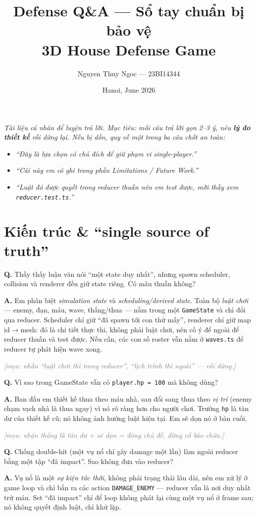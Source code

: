 \documentclass[12pt,a4paper]{article}
\title{\bfseries Defense Q\&A --- Sổ tay chuẩn bị bảo vệ\\
       \large 3D House Defense Game}
\author{Nguyen Thuy Ngoc --- 23BI14344}
\date{Hanoi, June 2026}
\newcommand{\QA}[2]{%
  \par\medskip\noindent\textbf{\textcolor{blue!60!black}{Q.}} #1\par
  \smallskip\noindent\textbf{\textcolor{green!45!black}{A.}} #2\par}
\newcommand{\tip}[1]{\par\smallskip\noindent%
  \textit{\textcolor{gray}{[mẹo: #1]}}\par}
\begin{document}
\maketitle

\noindent\textit{Tài liệu cá nhân để luyện trả lời. Mục tiêu: mỗi câu trả lời
gọn 2--3 ý, nêu \textbf{lý do thiết kế} rồi dừng lại. Nếu bị dồn, quy về một
trong ba câu chốt an toàn:}
\begin{itemize}[nosep]
  \item \textit{``Đây là lựa chọn có chủ đích để giữ phạm vi single-player.''}
  \item \textit{``Cái này em có ghi trong phần Limitations / Future Work.''}
  \item \textit{``Luật đó được quyết trong reducer thuần nên em test được, mời
        thầy xem \texttt{reducer.test.ts}.''}
\end{itemize}

\tableofcontents
\bigskip

\section{Kiến trúc \& ``single source of truth''}

\QA{Thầy thấy luận văn nói ``một state duy nhất'', nhưng spawn scheduler, collision
và renderer đều giữ state riêng. Có mâu thuẫn không?}
{Em phân biệt \emph{simulation state} và \emph{scheduling/derived state}. Toàn bộ
\emph{luật chơi} --- enemy, đạn, máu, wave, thắng/thua --- nằm trong một
\texttt{GameState} và chỉ đổi qua reducer. Scheduler chỉ giữ ``đã spawn tới con
thứ mấy'', renderer chỉ giữ map id$\to$mesh: đó là chi tiết thực thi, không phải
luật chơi, nên cố ý để ngoài để reducer thuần và test được. Nếu cần, các con số
roster vẫn nằm ở \texttt{waves.ts} để reducer tự phát hiện wave xong.}
\tip{nhấn ``luật chơi thì trong reducer'', ``lịch trình thì ngoài'' --- rồi dừng.}

\QA{Vì sao trong GameState vẫn có \texttt{player.hp = 100} mà không dùng?}
{Ban đầu em thiết kế thua theo máu nhà, sau đổi sang thua theo \emph{vị trí}
(enemy chạm vạch nhà là thua ngay) vì nó rõ ràng hơn cho người chơi. Trường
\texttt{hp} là tàn dư của thiết kế cũ; nó không ảnh hưởng luật hiện tại. Em sẽ dọn
nó ở bản cuối.}
\tip{nhận thẳng là tàn dư + sẽ dọn = đóng chủ đề, đừng cố bào chữa.}

\QA{Chống double-hit (một vụ nổ chỉ gây damage một lần) làm ngoài reducer bằng
một tập ``đã impact''. Sao không đưa vào reducer?}
{Vụ nổ là một \emph{sự kiện tức thời}, không phải trạng thái lâu dài, nên em xử lý
ở game loop và chỉ bắn ra các action \texttt{DAMAGE\_ENEMY} --- reducer vẫn là nơi
duy nhất trừ máu. Set ``đã impact'' chỉ để loop không phát lại cùng một vụ nổ ở
frame sau; nó không quyết định luật, chỉ khử lặp.}
\end{document}

